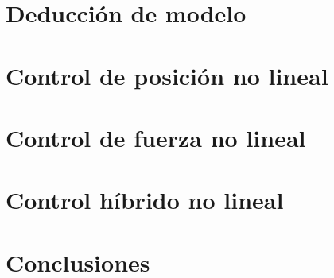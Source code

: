



\def\verObs{0}


\setmainfont{AvenirLTStd-Roman}



\setmainfont{Calibri}


\tableofcontents
\newpage


\section{Deducción de modelo}


\section{Control de posición no lineal}


\section{Control de fuerza no lineal}


\section{Control híbrido no lineal}


\section{Conclusiones}


%

